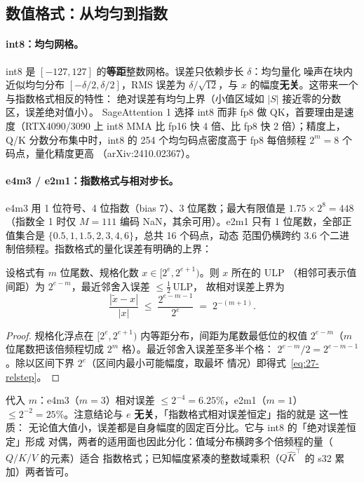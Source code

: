 \subsection{数值格式：从均匀到指数}

\paragraph{int8：均匀网格。}
int8 是 $[-127,127]$ 的\textbf{等距}整数网格。误差只依赖步长 $\delta$：均匀量化
噪声在块内近似均匀分布 $[-\delta/2, \delta/2]$，RMS 误差为
$\delta/\sqrt{12}$，与 $x$ 的幅度\textbf{无关}。这带来一个与指数格式相反的特性：
绝对误差有均匀上界（小值区域如 $|S|$ 接近零的分数区，误差绝对值小）。
SageAttention 1 选择 int8 而非 fp8 做 QK，首要理由是速度（RTX4090/3090 上
int8 MMA 比 fp16 快 4 倍、比 fp8 快 2 倍）；精度上，Q/K 分数分布集中时，int8
的 254 个均匀码点密度高于 fp8 每倍频程 $2^m=8$ 个码点，量化精度更高
（arXiv:2410.02367）。

\paragraph{e4m3 / e2m1：指数格式与相对步长。}
e4m3 用 1 位符号、4 位指数（bias 7）、3 位尾数；最大有限值是
$1.75 \times 2^{8} = 448$（指数全 1 时仅 $M=111$ 编码 NaN，其余可用）。e2m1 只有
1 位尾数，全部正值集合是 $\{0.5, 1, 1.5, 2, 3, 4, 6\}$，总共 16 个码点，动态
范围仍横跨约 3.6 个二进制倍频程。指数格式的量化误差有明确的上界：

\begin{theorem}[指数格式的相对步长]\label{thm:27-relstep}
设格式有 $m$ 位尾数、规格化数 $x \in [2^{e}, 2^{e+1})$。则 $x$ 所在的 ULP
（相邻可表示值间距）为 $2^{e-m}$，最近邻舍入误差 $\le \tfrac{1}{2}\,\mathrm{ULP}$，
故相对误差上界为
\begin{equation}
  \frac{|\tilde{x} - x|}{|x|}
  \;\le\;
  \frac{2^{e-m-1}}{2^{e}}
  \;=\; 2^{-(m+1)} .
  \label{eq:27-relstep}
\end{equation}
\end{theorem}

\begin{proof}
规格化浮点在 $[2^{e}, 2^{e+1})$ 内等距分布，间距为尾数最低位的权值
$2^{e-m}$（$m$ 位尾数把该倍频程切成 $2^{m}$ 格）。最近邻舍入误差至多半个格：
$2^{e-m}/2 = 2^{e-m-1}$。除以区间下界 $2^{e}$（区间内最小可能幅度，取最坏
情况）即得式~\ref{eq:27-relstep}。
\end{proof}

代入 $m$：e4m3（$m{=}3$）相对误差 $\le 2^{-4} = 6.25\%$，e2m1（$m{=}1$）
$\le 2^{-2} = 25\%$。注意结论与 $e$ \textbf{无关}，「指数格式相对误差恒定」指的就是
这一性质：
无论值大值小，误差都是自身幅度的固定百分比。它与 int8 的「绝对误差恒定」形成
对偶，两者的适用面也因此分化：值域分布横跨多个倍频程的量（$Q/K/V$ 的元素）适合
指数格式；已知幅度紧凑的整数域乘积（$\hat{Q}\hat{K}^{\top}$ 的 s32 累加）两者皆可。

